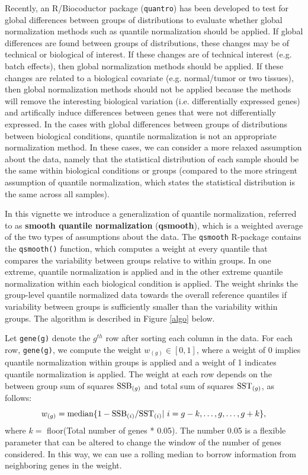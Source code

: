 \documentclass{article}
\begin{document}
Recently, an R/Biocoductor package (\texttt{quantro}) \cite{Hicks2015}
has been developed to test for global differences between groups of
distributions to evaluate whether global normalization methods such
as quantile normalization should be applied. If global differences
are found between groups of distributions, these changes may be of technical
or biological of interest. If these changes are of technical interest
(e.g. batch effects), then global normalization methods should be applied.
If these changes are related to a biological covariate (e.g. normal/tumor or
two tissues), then global normalization methods should not be applied
because the methods will remove the interesting biological variation
(i.e. differentially expressed genes) and artifically induce differences
between genes that were not differentially expressed. In the cases
with global differences between groups of distributions
between biological conditions, quantile normalization is
not an appropriate normalization method. In
these cases, we can consider a more relaxed assumption about the data,
namely that the statistical distribution of each sample should be the
same within biological conditions or groups (compared to the more
stringent assumption of quantile normalization, which states the
statistical distribution is the same across all samples).

In this vignette we introduce a generalization of quantile
normalization, referred to as \textbf{smooth quantile normalization}
(\textbf{qsmooth}), which is a weighted average of the two
types of assumptions about the data. The \texttt{qsmooth} R-package
contains the \texttt{qsmooth()} function, which computes a weight at
every quantile that compares the variability between groups relative
to within groups. In one extreme, quantile normalization is applied
and in the other extreme quantile normalization within each
biological condition is applied. The weight shrinks the group-level
quantile normalized data towards the overall reference quantiles
if variability between groups is sufficiently smaller than the
variability within groups. The algorithm is described in
Figure \ref{algo} below.

Let \texttt{gene(g)} denote the ${g}^{th}$ row after sorting
each column in the data. For each row, \texttt{gene(g)}, we
compute the weight $w_{(g)} \in [0, 1]$, where a weight of 0 implies
quantile normalization within groups is applied and
a weight of 1 indicates quantile normalization is applied.
The weight at each row depends on the between group sum of squares
$\hbox{SSB}_{(g)}$ and total sum of squares $\hbox{SST}_{(g)}$,
as follows:
\begin{equation}
w_{(g)} = \hbox{median} \{1 - \hbox{SSB}_{(i)} / \hbox{SST}_{(i)} | ~i = g-k, \dots, g, \dots, g+k \},
\end{equation}
where $k=$ floor(Total number of genes * 0.05). The number
0.05 is a flexible parameter that can be altered to change the
window of the number of genes considered. In this way, we
can use a rolling median to borrow information from
neighboring genes in the weight.
\end{document}
